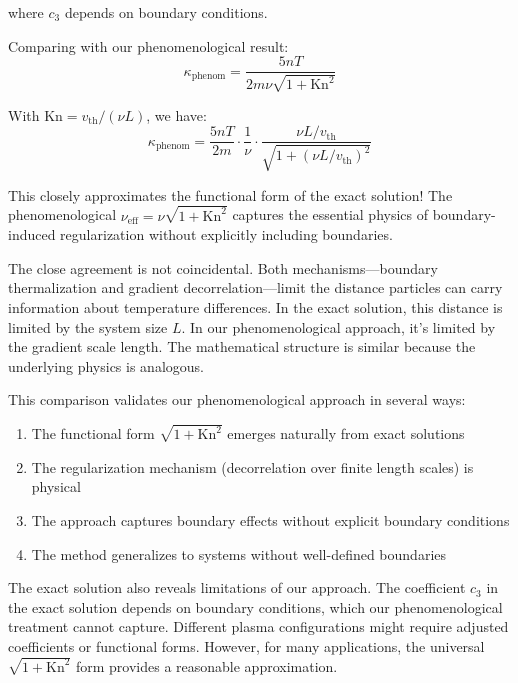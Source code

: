 \documentclass[12pt,a4paper]{article}
\newcommand{\Kn}{\text{Kn}}
\newcommand{\eff}{\text{eff}}
\begin{document}
where $c_3$ depends on boundary conditions.

Comparing with our phenomenological result:
\begin{equation}
\kappa_{\text{phenom}} = \frac{5nT}{2m\nu\sqrt{1 + \Kn^2}}
\label{eq:kappa_phenomenological}
\end{equation}

With $\Kn = v_{\text{th}}/(\nu L)$, we have:
\begin{equation}
\kappa_{\text{phenom}} = \frac{5nT}{2m} \cdot \frac{1}{\nu} \cdot \frac{\nu L/v_{\text{th}}}{\sqrt{1 + (\nu L/v_{\text{th}})^2}}
\label{eq:kappa_phenom_rewritten}
\end{equation}

This closely approximates the functional form of the exact solution! The phenomenological $\nu_{\eff} = \nu\sqrt{1 + \Kn^2}$ captures the essential physics of boundary-induced regularization without explicitly including boundaries.

The close agreement is not coincidental. Both mechanisms—boundary thermalization and gradient decorrelation—limit the distance particles can carry information about temperature differences. In the exact solution, this distance is limited by the system size $L$. In our phenomenological approach, it's limited by the gradient scale length. The mathematical structure is similar because the underlying physics is analogous.

This comparison validates our phenomenological approach in several ways:
\begin{enumerate}[leftmargin=*]
\item The functional form $\sqrt{1 + \Kn^2}$ emerges naturally from exact solutions
\item The regularization mechanism (decorrelation over finite length scales) is physical
\item The approach captures boundary effects without explicit boundary conditions
\item The method generalizes to systems without well-defined boundaries
\end{enumerate}

The exact solution also reveals limitations of our approach. The coefficient $c_3$ in the exact solution depends on boundary conditions, which our phenomenological treatment cannot capture. Different plasma configurations might require adjusted coefficients or functional forms. However, for many applications, the universal $\sqrt{1 + \Kn^2}$ form provides a reasonable approximation.
\end{document}
